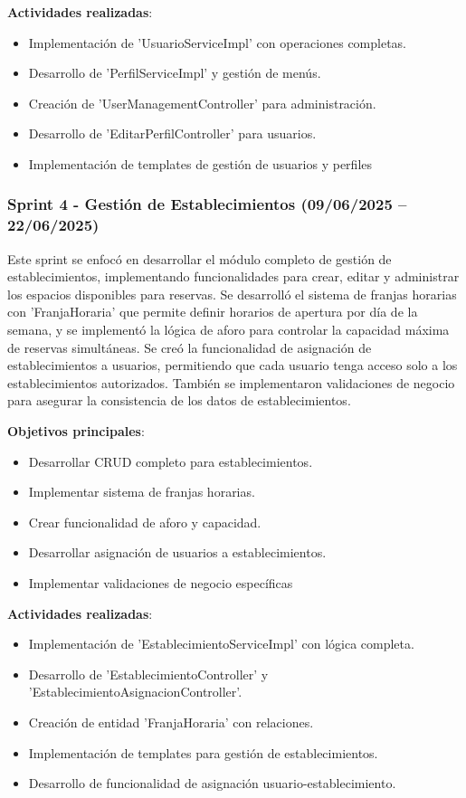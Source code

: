 \textbf{Actividades realizadas}:
\begin{itemize}
\tightlist
\item
Implementación de 'UsuarioServiceImpl' con operaciones completas.
\item
Desarrollo de 'PerfilServiceImpl' y gestión de menús.
\item
Creación de 'UserManagementController' para administración.
\item
Desarrollo de 'EditarPerfilController' para usuarios.
\item
Implementación de templates de gestión de usuarios y perfiles
\end{itemize}

\subsubsection{Sprint 4 - Gestión de Establecimientos (09/06/2025 – 22/06/2025)} 
Este sprint se enfocó en desarrollar el módulo completo de gestión de establecimientos, implementando funcionalidades para crear, editar y administrar los espacios disponibles para reservas. Se desarrolló el sistema de franjas horarias con 'FranjaHoraria' que permite definir horarios de apertura por día de la semana, y se implementó la lógica de aforo para controlar la capacidad máxima de reservas simultáneas. Se creó la funcionalidad de asignación de establecimientos a usuarios, permitiendo que cada usuario tenga acceso solo a los establecimientos autorizados. También se implementaron validaciones de negocio para asegurar la consistencia de los datos de establecimientos.

\textbf{Objetivos principales}:
\begin{itemize}
\tightlist
\item
Desarrollar CRUD completo para establecimientos.
\item
Implementar sistema de franjas horarias.
\item
Crear funcionalidad de aforo y capacidad.
\item
Desarrollar asignación de usuarios a establecimientos.
\item
Implementar validaciones de negocio específicas
\end{itemize}

\textbf{Actividades realizadas}:
\begin{itemize}
\tightlist
\item
Implementación de 'EstablecimientoServiceImpl' con lógica completa.
\item
Desarrollo de 'EstablecimientoController' y 'EstablecimientoAsignacionController'.
\item
Creación de entidad 'FranjaHoraria' con relaciones.
\item
Implementación de templates para gestión de establecimientos.
\item
Desarrollo de funcionalidad de asignación usuario-establecimiento.
\end{itemize}


